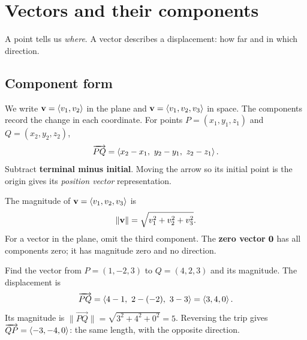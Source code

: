 \documentclass[11pt]{article}
\begin{document}

\section{Vectors and their components}
A point tells us \emph{where}. A vector describes a displacement: how far
and in which direction.


\subsection*{Component form}
We write $\mathbf{v}=\left\langle v_1,v_2\right\rangle$ in the plane and
$\mathbf{v}=\left\langle v_1,v_2,v_3\right\rangle$ in space. The components record the change in each
coordinate. For points $P=(x_1,y_1,z_1)$ and $Q=(x_2,y_2,z_2)$,
\[
  \vec{PQ}=\cvec{x_2-x_1,\ y_2-y_1,\ z_2-z_1}.
\]
Subtract \textbf{terminal minus initial}. Moving the arrow so its initial
point is the origin gives its \emph{position vector} representation.

\begin{definition}[Magnitude]
The magnitude of $\mathbf{v}=\left\langle v_1,v_2,v_3\right\rangle$ is
\[
  \lVert\mathbf{v}\rVert=\sqrt{v_1^2+v_2^2+v_3^2}.
\]
For a vector in the plane, omit the third component. The \textbf{zero vector}
$\mathbf{0}$ has all components zero; it has magnitude zero and no direction.
\end{definition}

\begin{example}{Find the vector from $P=(1,-2,3)$ to $Q=(4,2,3)$ and its magnitude.}
The displacement is
\[
  \vec{PQ}=\cvec{4-1,\ 2-(-2),\ 3-3}=\cvec{3,4,0}.
\]
Its magnitude is $\lVert\vec{PQ}\rVert=\sqrt{3^2+4^2+0^2}=5$.
Reversing the trip gives $\overrightarrow{QP}=\left\langle -3,-4,0\right\rangle$: the same length,
with the opposite direction.
\end{example}
\end{document}
